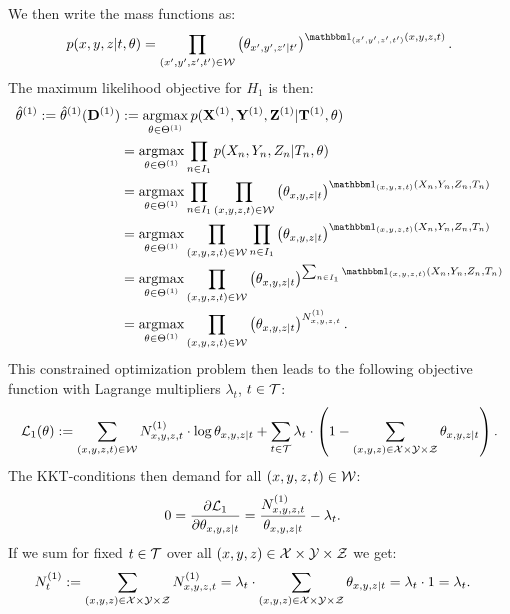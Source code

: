 We then write the mass functions as:
\[ p(x,y,z|t,\theta) = \prod_{(x',y',z',t')\in \Wcal} \lp \theta_{x',y',z'|t'} \rp^{\I_{(x',y',z',t')}(x,y,z,t)}.\]
The maximum likelihood objective for $H_1$ is then:
\begin{align*} \hat \theta^{(1)} := \hat \theta^{(1)}(\Dbf^{(1)}) 
&:= \argmax_{\theta \in\Theta^{(1)}} p(\Xbf^{(1)},\Ybf^{(1)},\Zbf^{(1)}|\Tbf^{(1)},\theta) \\
&= \argmax_{\theta \in\Theta^{(1)}} \prod_{n \in I_1}  p(X_n,Y_n,Z_n|T_n,\theta) \\
&= \argmax_{\theta \in\Theta^{(1)}} \prod_{n \in I_1} \prod_{(x,y,z,t)\in \Wcal} \lp \theta_{x,y,z|t} \rp^{\I_{(x,y,z,t)}(X_n,Y_n,Z_n,T_n)} \\
&= \argmax_{\theta \in\Theta^{(1)}} \prod_{(x,y,z,t)\in \Wcal} \prod_{n \in I_1} \lp \theta_{x,y,z|t} \rp^{\I_{(x,y,z,t)}(X_n,Y_n,Z_n,T_n)} \\
&= \argmax_{\theta \in\Theta^{(1)}} \prod_{(x,y,z,t)\in \Wcal} \lp \theta_{x,y,z|t} \rp^{\sum_{n \in I_1} \I_{(x,y,z,t)}(X_n,Y_n,Z_n,T_n)} \\
&= \argmax_{\theta \in\Theta^{(1)}} \prod_{(x,y,z,t)\in \Wcal} \lp \theta_{x,y,z|t} \rp^{ N_{x,y,z,t}^{(1)}}.%
\end{align*}
This constrained optimization problem then leads to the following objective function with Lagrange multipliers $\lambda_t$, $t \in \mathcal{T}$:
\[ \mathcal{L}_1(\theta) := \sum_{(x,y,z,t)\in \mathcal{W}} N_{x,y,z,t}^{(1)} \cdot \log \theta_{x,y,z|t} + 
\sum_{t \in \mathcal{T}} \lambda_{t} \cdot \left ( 1- \sum_{(x,y,z) \in\mathcal{X}\times\mathcal{Y}\times\mathcal{Z}} \theta_{x,y,z|t}\right ).   \]
The KKT-conditions then demand for all $(x,y,z,t) \in \mathcal{W}$:
\begin{align*}
    0= \frac{\partial \mathcal{L}_1}{\partial\theta_{x,y,z|t}} &= \frac{N_{x,y,z,t}^{(1)}}{\theta_{x,y,z|t}}  - \lambda_t.
\end{align*}
If we sum for fixed $t \in \mathcal{T}$ over all $(x,y,z) \in \mathcal{X}\times\mathcal{Y}\times\mathcal{Z}$ we get:
\begin{align*}
    N_{t}^{(1)} &:= \sum_{(x,y,z) \in \mathcal{X}\times\mathcal{Y}\times\mathcal{Z}} N_{x,y,z,t}^{(1)} 
        =  \lambda_t \cdot \sum_{(x,y,z) \in \mathcal{X}\times\mathcal{Y}\times\mathcal{Z}} \theta_{x,y,z|t} 
        = \lambda_t \cdot 1
        =\lambda_t.
\end{align*}
